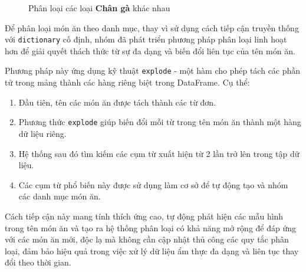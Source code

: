 \begin{figure}[H]
    \centering
    \caption{Phân loại các loại \textbf{Chân gà} khác nhau}
    \label{fig:phan_loai}
\end{figure}

Để phân loại món ăn theo danh mục, thay vì sử dụng cách tiếp cận truyền thống với \texttt{dictionary} cố định, nhóm đã phát triển phương pháp phân loại linh hoạt hơn để giải quyết thách thức từ sự đa dạng và biến đổi liên tục của tên món ăn.

Phương pháp này ứng dụng kỹ thuật \texttt{explode} - một hàm cho phép tách các phần tử trong mảng thành các hàng riêng biệt trong DataFrame. Cụ thể:
\begin{enumerate}
    \item Đầu tiên, tên các món ăn được tách thành các từ đơn.
    
    \item Phương thức \texttt{explode} giúp biến đổi mỗi từ trong tên món ăn thành một hàng dữ liệu riêng.
    
    \item Hệ thống sau đó tìm kiếm các cụm từ xuất hiện từ 2 lần trở lên trong tập dữ liệu.
    
    \item Các cụm từ phổ biến này được sử dụng làm cơ sở để tự động tạo và nhóm các danh mục món ăn.
\end{enumerate}

Cách tiếp cận này mang tính thích ứng cao, tự động phát hiện các mẫu hình trong tên món ăn và tạo ra hệ thống phân loại có khả năng mở rộng để đáp ứng với các món ăn mới, độc lạ mà không cần cập nhật thủ công các quy tắc phân loại, đảm bảo hiệu quả trong việc xử lý dữ liệu ẩm thực đa dạng và liên tục thay đổi theo thời gian.

